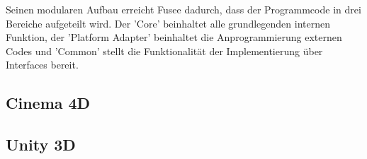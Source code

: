 Seinen modularen Aufbau erreicht Fusee dadurch, dass der Programmcode in drei Bereiche aufgeteilt wird. Der 'Core' beinhaltet alle grundlegenden internen Funktion, der 'Platform Adapter' beinhaltet die Anprogrammierung externen Codes und 'Common' stellt die Funktionalität der Implementierung über Interfaces bereit.

\subsection{Cinema 4D}

\subsection{Unity 3D}